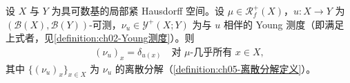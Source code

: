 \documentclass[../../main.tex]{subfiles}%
\begin{document}
\begin{proposition}\label{proposition:ch05-Dirac测度}
设 $X$ 与 $Y$ 为具可数基的局部紧 Hausdorff 空间。设 $\mu\in\mathscr{R}^+_f(X)$，$u:X\to Y$ 为 $(\mathscr{B}(X),\mathscr{B}(Y))$-可测，$\nu_u\in\mathcal{Y}^+(X;Y)$ 为与 $u$ 相伴的 Young 测度（即满足上式者，见\cref{definition:ch02-Young测度}）。则
\begin{align}
(\nu_u)_x=\delta_{u(x)}
\quad\text{对 }\mu\text{-几乎所有 }x\in X,\label{align:ch05-5.53}
\end{align}
其中 $\{(\nu_u)_x\}_{x\in X}$ 为 $\nu_u$ 的离散分解（\cref{definition:ch05-离散分解定义}）。
\end{proposition}

\end{document}
